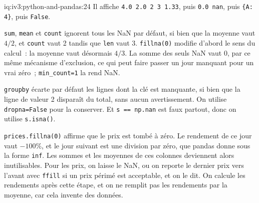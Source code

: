 \begin{solution}{iq:iv3:python-and-pandas:24}
Il affiche \texttt{4.0 2.0 2 3 1.33}, puis \texttt{0.0 nan}, puis \texttt{\{\textquotesingle A\textquotesingle: 4\}}, puis \texttt{False}.

\texttt{sum}, \texttt{mean} et \texttt{count} ignorent tous les NaN par défaut, si bien que la moyenne vaut $4 / 2$, et \texttt{count} vaut 2 tandis que \texttt{len} vaut 3. \texttt{fillna(0)} modifie d'abord le sens du calcul~: la moyenne vaut désormais $4 / 3$. La somme des seuls NaN vaut 0, par ce même mécanisme d'exclusion, ce qui peut faire passer un jour manquant pour un vrai zéro~; \texttt{min\_count=1} la rend NaN.

\texttt{groupby} écarte par défaut les lignes dont la clé est manquante, si bien que la ligne de valeur 2 disparaît du total, sans aucun avertissement. On utilise \texttt{dropna=False} pour la conserver. Et \texttt{s == np.nan} est faux partout, donc on utilise \texttt{s.isna()}.

\texttt{prices.fillna(0)} affirme que le prix est tombé à zéro. Le rendement de ce jour vaut $-100\%$, et le jour suivant est une division par zéro, que pandas donne sous la forme \texttt{inf}. Les sommes et les moyennes de ces colonnes deviennent alors inutilisables. Pour les prix, on laisse le NaN, ou on reporte le dernier prix vers l'avant avec \texttt{ffill} si un prix périmé est acceptable, et on le dit. On calcule les rendements après cette étape, et on ne remplit pas les rendements par la moyenne, car cela invente des données.

\end{solution}

